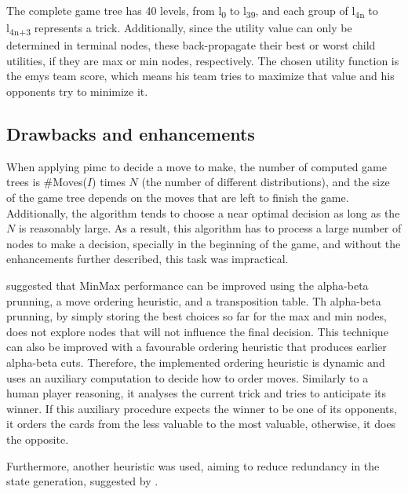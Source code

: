 The complete game tree has 40 levels, from l\textsubscript{0} to l\textsubscript{39}, and each group of l\textsubscript{4n} to l\textsubscript{4n+3} represents a trick.
Additionally, since the utility value can only be determined in terminal nodes, these back-propagate their best or worst child utilities, if they are max or min nodes, respectively.
The chosen utility function is the \ac{emys} team score, which means his team tries to maximize that value and his opponents try to minimize it.


\subsection{Drawbacks and enhancements}

When applying \ac{pimc} to decide a move to make, the number of computed game trees is \#Moves($I$) times $N$ (the number of different distributions), and the size of the game tree depends on the moves that are left to finish the game.
Additionally, the algorithm tends to choose a near optimal decision as long as the $N$ is reasonably large.
As a result, this algorithm has to process a large number of nodes to make a decision, specially in the beginning of the game, and without the enhancements further described, this task was impractical.

\citet*{Russell2009} suggested that MinMax performance can be improved using the alpha-beta prunning, a move ordering heuristic, and a transposition table.
Th alpha-beta prunning, by simply storing the best choices so far for the max and min nodes, does not explore nodes that will not influence the final decision.
This technique can also be improved with a favourable ordering heuristic that produces earlier alpha-beta cuts.
Therefore, the implemented ordering heuristic is dynamic and uses an auxiliary computation to decide how to order moves.
Similarly to a human player reasoning, it analyses the current trick and tries to anticipate its winner.
If this auxiliary procedure expects the winner to be one of its opponents, it orders the cards from the less valuable to the most valuable, otherwise, it does the opposite.

Furthermore, another heuristic was used, aiming to reduce redundancy in the state generation, suggested by \cite{Buro}.













